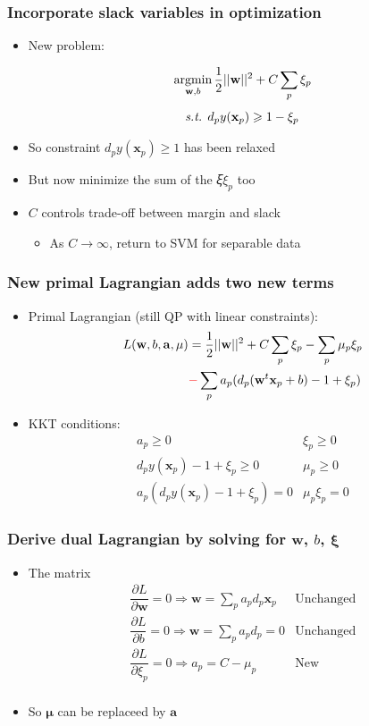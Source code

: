 \documentclass[12pt,notes,mathserif]{beamer}
\begin{document}
\begin{frame}[c]
\frametitle{Incorporate slack variables in optimization}
\begin{itemize}
\item New problem:


$$\mathop{\mathrm{argmin}}_{\mathbf{w},b}  \frac{1}{2} ||\mathbf{w}||^2+C\sum_p\xi_p$$
$$\text{\textit{s.t.} }  d_py(\mathbf{x}_p)\geqslant{}1-\xi_p$$

\item So constraint $d_py(\mathbf{x}_p)\geqslant{}1$ has been relaxed
\item But now minimize the sum of the 𝜉$\xi_p$ too
\item $C$ controls trade-off between margin and slack
\begin{itemize}
\item As $C\to \infty$, return to SVM for separable data
\end{itemize}
\end{itemize}
\end{frame}

\begin{frame}[c]
\frametitle{New primal Lagrangian adds two new terms}
\begin{itemize}
\item Primal Lagrangian (still QP with linear constraints):
\begin{eqnarray*}
L(\mathbf{w},b,\mathbf{a},\mathbf{\mu}) &=\dfrac{1}{2}||\mathbf{w}||^2+C\sum_p\xi_p-\sum_p\mu_p\xi_p\\
\quad & {\color{red}{-}} \sum_pa_p(d_p(\mathbf{w}^t\mathbf{x}_p+b)-1+\xi_p)
\end{eqnarray*}
\item KKT conditions:
\[\begin{matrix}
a_p\geqslant{}0 &\xi_p\geqslant{}0\\
d_py(\mathbf{x}_p)-1+\xi_p\geqslant{}0&\mu_p\geqslant{}0\\
a_p(d_py(\mathbf{x}_p)-1+\xi_p)=0&\mu_p\xi_p=0
\end{matrix}\]
\end{itemize}
\end{frame}

\begin{frame}[c]
\frametitle{Derive dual Lagrangian by solving for $\mathbf{w}$, $b$, $\mathbf{\xi}$}
\begin{itemize}
\item The matrix
\[
\begin{matrix}
\dfrac{\partial L}{\partial \mathbf{w}}=0 \Rightarrow \mathbf{w}=\sum\limits_pa_pd_p\mathbf{x}_p&\text{Unchanged}\\
\dfrac{\partial L}{\partial b}=0 \Rightarrow \mathbf{w}=\sum\limits_pa_pd_p=0&\text{Unchanged}\\
\dfrac{\partial L}{\partial \xi_p}=0 \Rightarrow a_p=C-\mu_p&\text{New}\\
\end{matrix}
\]
\item So $\mathbf{\mu}$ can be replaceed by $\mathbf{a}$
\end{itemize}
\end{frame}
\end{document}

